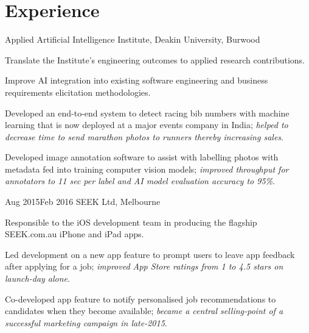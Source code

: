 \vspace{-1.5mm}
\section{Experience}
\vspace{3mm}

\def \asis{A\textsuperscript{2}I\textsuperscript{2}}

{Applied Artificial Intelligence Institute, Deakin University, Burwood}
{
  \item Translate the Institute's engineering outcomes to applied research contributions.
  \item Improve AI integration into existing software engineering and business requirements elicitation methodologies.
}
{
  \item Developed an end-to-end system to detect racing bib numbers with machine learning that is now deployed at a major events company in India; \textit{helped to decrease time to send marathon photos to runners thereby increasing sales}.
  \item Developed image annotation software to assist with labelling photos with metadata fed into training computer vision models; \textit{improved throughput for annotators to 11 sec per label and AI model evaluation accuracy to 95\%}.
}

{Aug 2015}{Feb 2016}
{SEEK Ltd, Melbourne}
{
  \item Responsible to the iOS development team in producing the flagship SEEK.com.au iPhone and iPad apps.
}
{
  \item Led development on a new app feature to prompt users to leave app feedback after applying for a job; \textit{improved App Store ratings from 1  to 4.5 stars on launch-day alone}.
  \item Co-developed app feature to notify personalised job recommendations to candidates when they become available; \textit{became a central selling-point of a successful marketing campaign in late-2015}.
}

